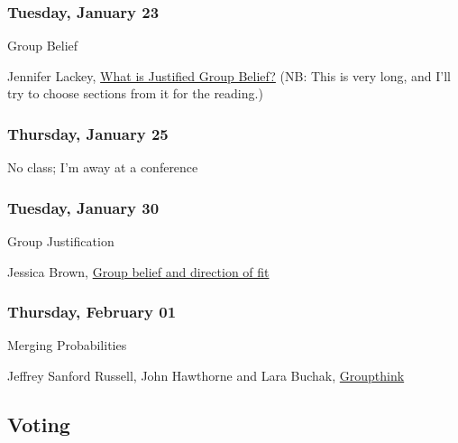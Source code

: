 \documentclass[
  12pt,
  letterpaper,
  DIV=11,
  numbers=noendperiod]{scrartcl}
\providecommand{\tightlist}{%
  \setlength{\itemsep}{0pt}\setlength{\parskip}{0pt}}\usepackage{longtable,booktabs,array}
\begin{document}
\subsubsection{Tuesday, January 23}\label{tuesday-january-23}

\begin{description}
\tightlist
\item[Topic]
Group Belief
\item[Reading]
Jennifer Lackey, \href{https://philpapers.org/rec/LACWIJ}{What is
Justified Group Belief?} (NB: This is very long, and I'll try to choose
sections from it for the reading.)
\end{description}

\subsubsection{Thursday, January 25}\label{thursday-january-25}

No class; I'm away at a conference

\subsubsection{Tuesday, January 30}\label{tuesday-january-30}

\begin{description}
\tightlist
\item[Topic]
Group Justification
\item[Reading]
Jessica Brown, \href{https://philpapers.org/rec/BROGBA-3}{Group belief
and direction of fit}
\end{description}

\subsubsection{Thursday, February 01}\label{thursday-february-01}

\begin{description}
\tightlist
\item[Topic]
Merging Probabilities
\item[Reading]
Jeffrey Sanford Russell, John Hawthorne and Lara Buchak,
\href{https://philpapers.org/rec/RUSG}{Groupthink}
\end{description}

\subsection{Voting}\label{voting}
\end{document}
